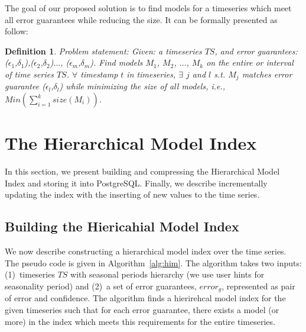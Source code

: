 \documentclass[10pt,conference,letterpaper]{IEEEtran}
\newcommand{\LN}{hierarchical model index}
\newcommand{\LNs}{hierarchical model index }
\newtheorem{mydef}{Definition}
\begin{document}
The goal of our proposed solution is to find models for a timeseries which meet all error guarantees while reducing the size. It can be formally presented as follow:
\begin{mydef} Problem statement: Given: a timeseries $TS$, and error guarantees: ($\epsilon_1$,$\delta_1$),($\epsilon_2$,$\delta_2$)$\dots$, ($\epsilon_m$,$\delta_m$). Find models $M_1$, $M_2$, $\dots$, $M_k$ on the entire or interval of time series $TS$. 
$\forall$ timestamp $t$ in timeseries,  $\exists$ $j$ and $l$ s.t. $M_j$ matches error guarantee ($\epsilon_l$,$\delta_l$) while minimizing the size of all models, i.e.,  $Min(\sum^k_{i=1}{size(M_i)})$.
\end{mydef}


\section{The Hierarchical Model Index}
\label{sec:building}
In this section, we present building and compressing the  Hierarchical Model Index and storing it into PostgreSQL. Finally, we describe incrementally updating the index with the inserting of new values to the time series.%
 
 
 \subsection{Building the Hiericahial Model Index}
We now describe constructing a \LNs over the time series. The pseudo code is given in Algorithm~\ref{alg:him}. The algorithm takes two inputs: (1)~timeseries $TS$ with seasonal periods hierarchy (we use user hints for seasonality period) and (2)~a set of error guarantees, $error_g$, represented as pair of error and confidence. 
The algorithm finds a hierirehcal model index for the given timeseries such that for each error guarantee, there exists a model (or more) in the index which meets this requirements for the entire timeseries.
\end{document}
